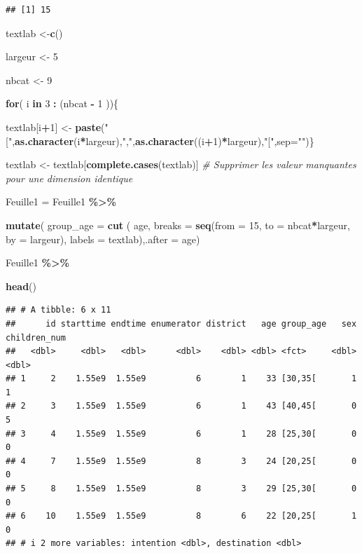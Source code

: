 \documentclass[
]{article}
\newenvironment{Shaded}{\begin{snugshade}}{\end{snugshade}}
\newcommand{\AttributeTok}[1]{\textcolor[rgb]{0.13,0.29,0.53}{#1}}
\newcommand{\CommentTok}[1]{\textcolor[rgb]{0.56,0.35,0.01}{\textit{#1}}}
\newcommand{\ControlFlowTok}[1]{\textcolor[rgb]{0.13,0.29,0.53}{\textbf{#1}}}
\newcommand{\DecValTok}[1]{\textcolor[rgb]{0.00,0.00,0.81}{#1}}
\newcommand{\FunctionTok}[1]{\textcolor[rgb]{0.13,0.29,0.53}{\textbf{#1}}}
\newcommand{\NormalTok}[1]{#1}
\newcommand{\OtherTok}[1]{\textcolor[rgb]{0.56,0.35,0.01}{#1}}
\newcommand{\SpecialCharTok}[1]{\textcolor[rgb]{0.81,0.36,0.00}{\textbf{#1}}}
\newcommand{\StringTok}[1]{\textcolor[rgb]{0.31,0.60,0.02}{#1}}
\begin{document}
\begin{verbatim}
## [1] 15
\end{verbatim}

\begin{Shaded}
\begin{Highlighting}[]
\NormalTok{textlab }\OtherTok{\textless{}{-}}\FunctionTok{c}\NormalTok{()}

\NormalTok{largeur }\OtherTok{\textless{}{-}} \DecValTok{5}

\NormalTok{nbcat }\OtherTok{\textless{}{-}} \DecValTok{9}

\ControlFlowTok{for}\NormalTok{( i }\ControlFlowTok{in} \DecValTok{3} \SpecialCharTok{:}\NormalTok{ (nbcat }\SpecialCharTok{{-}} \DecValTok{1}\NormalTok{ ))\{}
  
\NormalTok{textlab[i}\SpecialCharTok{+}\DecValTok{1}\NormalTok{] }\OtherTok{\textless{}{-}} \FunctionTok{paste}\NormalTok{(}\StringTok{"["}\NormalTok{,}\FunctionTok{as.character}\NormalTok{(i}\SpecialCharTok{*}\NormalTok{largeur),}\StringTok{","}\NormalTok{,}\FunctionTok{as.character}\NormalTok{((i}\SpecialCharTok{+}\DecValTok{1}\NormalTok{)}\SpecialCharTok{*}\NormalTok{largeur),}\StringTok{"["}\NormalTok{,}\AttributeTok{sep=}\StringTok{""}\NormalTok{)\}}

\NormalTok{textlab }\OtherTok{\textless{}{-}}\NormalTok{ textlab[}\FunctionTok{complete.cases}\NormalTok{(textlab)]}
\CommentTok{\# Supprimer les valeur manquantes pour une dimension identique}


\NormalTok{Feuille1 }\OtherTok{=}\NormalTok{ Feuille1 }\SpecialCharTok{\%\textgreater{}\%} 
  
  \FunctionTok{mutate}\NormalTok{( }\AttributeTok{group\_age =} \FunctionTok{cut}\NormalTok{ ( age, }\AttributeTok{breaks =} \FunctionTok{seq}\NormalTok{(}\AttributeTok{from =} \DecValTok{15}\NormalTok{, }\AttributeTok{to =}\NormalTok{ nbcat}\SpecialCharTok{*}\NormalTok{largeur,}
                                              \AttributeTok{by =}\NormalTok{ largeur), }\AttributeTok{labels =}\NormalTok{ textlab),}\AttributeTok{.after =}\NormalTok{ age) }

\NormalTok{Feuille1 }\SpecialCharTok{\%\textgreater{}\%}
  
  \FunctionTok{head}\NormalTok{()}
\end{Highlighting}
\end{Shaded}

\begin{verbatim}
## # A tibble: 6 x 11
##      id starttime endtime enumerator district   age group_age   sex children_num
##   <dbl>     <dbl>   <dbl>      <dbl>    <dbl> <dbl> <fct>     <dbl>        <dbl>
## 1     2    1.55e9  1.55e9          6        1    33 [30,35[       1            1
## 2     3    1.55e9  1.55e9          6        1    43 [40,45[       0            5
## 3     4    1.55e9  1.55e9          6        1    28 [25,30[       0            0
## 4     7    1.55e9  1.55e9          8        3    24 [20,25[       0            0
## 5     8    1.55e9  1.55e9          8        3    29 [25,30[       0            0
## 6    10    1.55e9  1.55e9          8        6    22 [20,25[       1            0
## # i 2 more variables: intention <dbl>, destination <dbl>
\end{verbatim}
\end{document}
